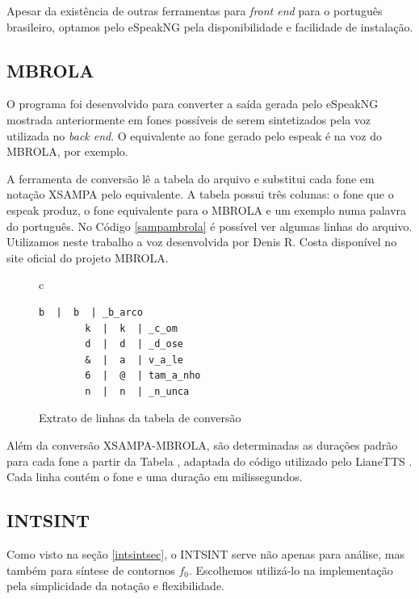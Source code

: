 Apesar da existência de outras ferramentas para \emph{front end} para o
português brasileiro, optamos pelo eSpeakNG pela disponibilidade e facilidade de
instalação.


\subsection{MBROLA}
O programa  foi desenvolvido para converter a saída gerada
pelo eSpeakNG mostrada anteriormente em fones possíveis de serem sintetizados
pela voz utilizada no \emph{back end}. O equivalente ao fone \code{/&/} gerado
pelo espeak é  na voz do MBROLA, por exemplo.

A ferramenta de conversão lê a tabela do arquivo  e
substitui cada fone em notação XSAMPA pelo equivalente. A tabela possui três
colunas: o fone que o espeak produz, o fone equivalente para o MBROLA e um
exemplo numa palavra do português. No Código \ref{sampambrola} é possível ver
algumas linhas do arquivo. Utilizamos neste trabalho a voz 
desenvolvida por Denis R. Costa disponível no site oficial do projeto MBROLA.

\begin{figure}[thp]
    \centering
    \begin{tabular}{c}
        \begin{lstlisting}[label=sampambrola]
        b  |  b  | _b_arco
        k  |  k  | _c_om
        d  |  d  | _d_ose
        &  |  a  | v_a_le
        6  |  @  | tam_a_nho
        n  |  n  | _n_unca
        \end{lstlisting}

    \end{tabular}
    \caption{Extrato de linhas da tabela de conversão}
\end{figure}

Além da conversão XSAMPA-MBROLA, são determinadas as durações padrão para cada
fone a partir da Tabela , adaptada do código utilizado pelo
LianeTTS \cite{lianetts}. Cada linha contém o fone e uma duração em milissegundos.

\subsection{INTSINT}
\label{intsintrules}
Como visto na seção \ref{intsintsec}, o INTSINT serve não apenas para análise,
mas também para síntese de contornos $ f_0 $. Escolhemos utilizá-lo na implementação
pela simplicidade da notação e flexibilidade.

